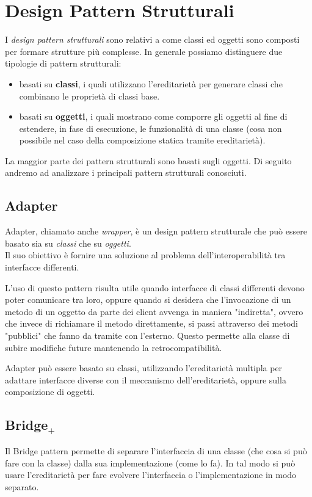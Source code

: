 \section{Design Pattern Strutturali}
I \textit{design pattern strutturali} sono relativi a come classi ed oggetti sono composti per formare strutture più complesse. In generale possiamo distinguere due tipologie di pattern strutturali:
\begin{itemize}
\item basati su \textbf{classi}, i quali utilizzano l'ereditarietà per generare classi che combinano le proprietà di classi base.
\item basati su \textbf{oggetti}, i quali mostrano come comporre gli oggetti al fine di estendere, in fase di esecuzione, le funzionalità di una classe (cosa non possibile nel caso della composizione statica tramite ereditarietà).
\end{itemize}
La maggior parte dei pattern strutturali sono basati sugli oggetti.
Di seguito andremo ad analizzare i principali pattern strutturali conosciuti.

\subsection{Adapter}
Adapter, chiamato anche \textit{wrapper}, è un design pattern strutturale che può essere basato sia su \textit{classi} che su \textit{oggetti}.\\
Il suo obiettivo è fornire una soluzione al problema dell'interoperabilità tra interfacce differenti.

L'uso di questo pattern risulta utile quando interfacce di classi differenti devono poter comunicare tra loro, oppure quando si desidera che l'invocazione di un metodo di un oggetto da parte dei client avvenga in maniera "indiretta", ovvero che invece di richiamare il metodo direttamente, si passi attraverso dei metodi "pubblici" che fanno da tramite con l'esterno. Questo permette alla classe di subire modifiche future mantenendo la retrocompatibilità.

Adapter può essere basato su classi, utilizzando l'ereditarietà multipla per adattare interfacce diverse con il meccanismo dell'ereditarietà, oppure sulla composizione di oggetti.

\subsection{Bridge$_+$}
Il Bridge pattern permette di separare l'interfaccia di una classe (che cosa si può fare con la classe) dalla sua implementazione (come lo fa). In tal modo si può usare l'ereditarietà per fare evolvere l'interfaccia o l'implementazione in modo separato.

